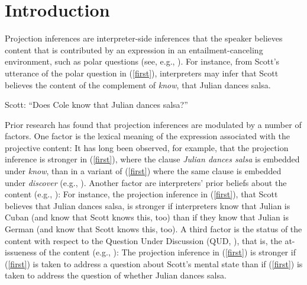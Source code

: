 \documentclass[11pt,fleqn]{article}
\newcommand{\6}{\mbox{$[\hspace*{-.6mm}[$}}
\newcommand{\9}{\mbox{$]\hspace*{-.6mm}]$}}
\begin{document}
\clearpage
{} 

\newpage


\section{Introduction}\label{s1}

Projection inferences are interpreter-side inferences that the speaker believes content that is contributed by an expression in an entailment-canceling environment, such as polar questions (see, e.g., \citealt{kiparsky-kiparsky70,potts05}). For instance, from Scott's utterance of the polar question in (\ref{first}), interpreters may infer that Scott believes the content of the complement of {\em know}, that Julian dances salsa. 

\begin{exe}
\ex\label{first} Scott: ``Does Cole know that Julian dances salsa?''
\end{exe}

Prior research has found that projection inferences are modulated by a number of factors. One factor is the lexical meaning of the expression associated with the projective content: It has long been observed, for example, that the projection inference is stronger in (\ref{first}), where the clause {\em Julian dances salsa} is embedded under {\em know}, than in a variant of (\ref{first}) where the same clause is embedded  under {\em discover} (e.g., \citealt{karttunen71b,tbd-variability,degen-tonhauser-language}). Another factor are interpreters' prior beliefs about the content (e.g., \citealt{mahler2020,degen-tonhauser-openmind}): For instance, the projection inference in (\ref{first}), that Scott believes that Julian dances salsa, is stronger if interpreters know that Julian is Cuban (and know that Scott knows this, too) than if they know that Julian is German (and know that Scott knows this, too). A third factor is the status of the content with respect to the Question Under Discussion (QUD, \citealt{roberts12}), that is, the at-issueness of the content (e.g., \citealt{brst-salt10,best-question,cummins-rohde2015,tonhauser-salt26,tbd-variability,djaerv-bacovcin-salt27,djaerv-bacovcin2020}): The projection inference in (\ref{first}) is stronger if (\ref{first}) is taken to address a question about Scott's mental state than if (\ref{first}) is taken to address the question of whether Julian dances salsa.
\end{document}
